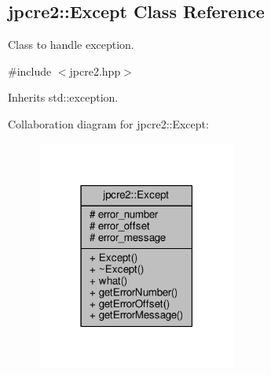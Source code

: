 \hypertarget{classjpcre2_1_1Except}{}\subsection{jpcre2\+:\+:Except Class Reference}
\label{classjpcre2_1_1Except}


Class to handle exception.  




{\ttfamily \#include $<$jpcre2.\+hpp$>$}



Inherits std\+::exception.



Collaboration diagram for jpcre2\+:\+:Except\+:\nopagebreak
\begin{figure}[H]
\begin{center}
\leavevmode
\includegraphics[width=186pt]{classjpcre2_1_1Except__coll__graph}
\end{center}
\end{figure}
